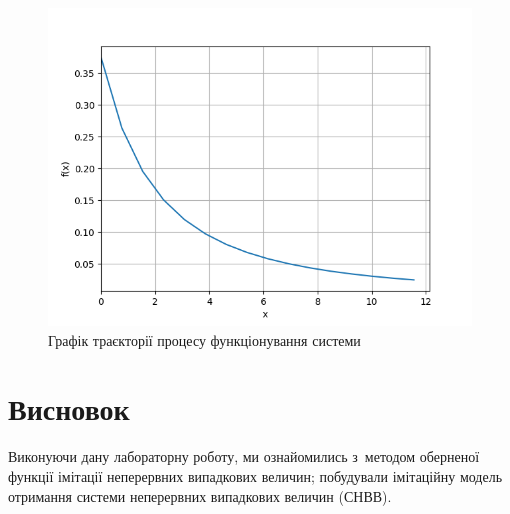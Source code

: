 \documentclass[
	a4paper,
	oneside,
	BCOR = 10mm,
	DIV = 12,
	12pt,
	headings = normal,
]{scrartcl}
\begin{document}
		\begin{figure}[!htbp]
			\centering
			\includegraphics[height = 14\baselineskip]{./assets/y03s02-imitmod-lab-04-p01.png}
			\caption{Графік траєкторії процесу функціонування системи}
			\label{fig:pmf}
		\end{figure}

		\section{Висновок}
			Виконуючи дану лабораторну роботу, ми ознайомились з~методом оберненої функції імітації неперервних випадкових величин; побудували імітаційну модель отримання системи неперервних випадкових величин (СНВВ).

		\appendix
\end{document}

